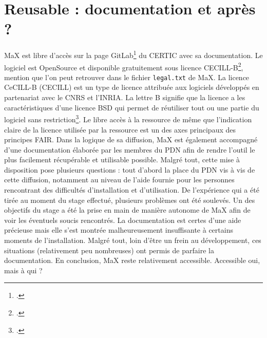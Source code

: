 \documentclass[a4paper,12pt,twoside]{book}
\begin{document}
\section{Reusable : documentation et après ?}
MaX est libre d'accès sur la page GitLab\footcite{pdn-certic} du \acrshort{CERTIC} avec sa documentation. Le logiciel est OpenSource et disponible gratuitement sous licence \acrshort{CECILL}-B\footcite{licences}, mention que l'on peut retrouver dans le fichier \texttt{legal.txt} de MaX. La licence CeCILL-B (\acrlong{CECILL}) est un type de licence attribuée aux logiciels développés en partenariat avec le \acrshort{CNRS} et l'\acrfull{INRIA}. La lettre B signifie que la licence a les caractéristiques d'une licence \acrfull{BSD} qui permet de réutiliser tout ou une partie du logiciel sans restriction\footcite{bsd}. Le libre accès à la ressource de même que l'indication claire de la licence utilisée par la ressource est un des axes principaux des principes FAIR. Dans la logique de sa diffusion, MaX est également accompagné d'une documentation élaborée par les membres du \acrshort{PDN} afin de rendre l'outil le plus facilement récupérable et utilisable possible. Malgré tout, cette mise à disposition pose plusieurs questions : tout d'abord la place du \acrshort{PDN} vis à vis de cette diffusion, notamment au niveau de l'aide fournie pour les personnes rencontrant des difficultés d'installation et d'utilisation. De l'expérience qui a été tirée au moment du stage effectué, plusieurs problèmes ont été soulevés. Un des objectifs du stage a été la prise en main de manière autonome de MaX afin de voir les éventuels soucis rencontrés. La documentation est certes d'une aide précieuse mais elle s'est montrée malheureusement insuffisante à certains moments de l'installation. Malgré tout, loin d'être un frein au développement, ces situations (relativement peu nombreuses) ont permis de parfaire la documentation. En conclusion, MaX reste relativement accessible. Accessible oui, mais à qui ?
\end{document}

